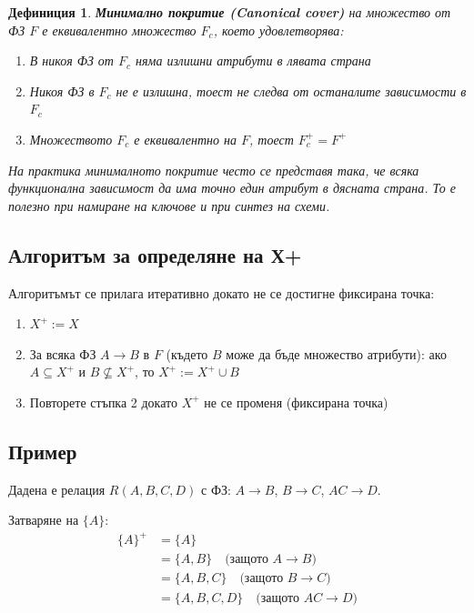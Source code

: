 \documentclass{scrartcl}
\newtheorem{definition}{Дефиниция}
\begin{document}
\begin{FlushLeft}
\begin{definition}
\textbf{\textit{Минимално покритие (Canonical cover)}} на множество от ФЗ $F$ е еквивалентно множество $F_c$, което удовлетворява:
\begin{enumerate}
    \item В никоя ФЗ от $F_c$ няма излишни атрибути в лявата страна
    \item Никоя ФЗ в $F_c$ не е излишна, тоест не следва от останалите зависимости в $F_c$
    \item Множеството $F_c$ е еквивалентно на $F$, тоест $F_c^+ = F^+$
\end{enumerate}
На практика минималното покритие често се представя така, че всяка функционална зависимост да има точно един атрибут в дясната страна. То е полезно при намиране на ключове и при синтез на схеми.
\end{definition}

\subsection{Алгоритъм за определяне на Х+}

Алгоритъмът се прилага итеративно докато не се достигне фиксирана точка:

\begin{enumerate}
    \item $X^+ := X$
    \item За всяка ФЗ $A \rightarrow B$ в $F$ (където $B$ може да бъде множество атрибути): ако $A \subseteq X^+$ и $B \not\subseteq X^+$, то $X^+ := X^+ \cup B$
    \item Повторете стъпка 2 докато $X^+$ не се променя (фиксирана точка)
\end{enumerate}

\subsection{Пример}

Дадена е релация $R(A, B, C, D)$ с ФЗ: $A \rightarrow B$, $B \rightarrow C$, $AC \rightarrow D$.

Затваряне на $\{A\}$:
\begin{align*}
\{A\}^+ &= \{A\} \\
&= \{A, B\} \quad \text{(защото } A \rightarrow B \text{)} \\
&= \{A, B, C\} \quad \text{(защото } B \rightarrow C \text{)} \\
&= \{A, B, C, D\} \quad \text{(защото } AC \rightarrow D \text{)}
\end{align*}


\end{FlushLeft}
\end{document}

